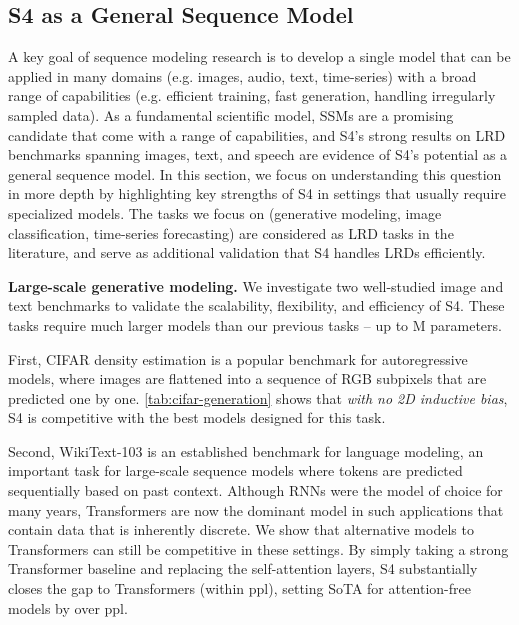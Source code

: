 \documentclass{article}
\newcommand{\methodabbrv}{S4}
\begin{document}
\subsection{\methodabbrv{} as a General Sequence Model}
\label{sec:experiments-general}

A key goal of sequence modeling research is to develop a single model that can be applied in many domains (e.g. images, audio, text, time-series) with a broad range of capabilities (e.g. efficient training, fast generation, handling irregularly sampled data).
As a fundamental scientific model, SSMs are a promising candidate that come with a range of capabilities, and \methodabbrv's strong results on LRD benchmarks spanning images, text, and speech are evidence of \methodabbrv's potential as a general sequence model.
In this section, we focus on understanding this question in more depth by highlighting key strengths of \methodabbrv{} in settings that usually require specialized models.
The tasks we focus on (generative modeling, image classification, time-series forecasting)
are considered as LRD tasks in the literature,
and serve as additional validation that \methodabbrv{} handles LRDs efficiently.


\textbf{Large-scale generative modeling.}
We investigate two well-studied image and text benchmarks to validate the scalability, flexibility, and efficiency of \methodabbrv.
These tasks require much larger models than our previous tasks -- up to M parameters.

First, CIFAR density estimation is a popular benchmark for autoregressive models, where images are flattened into a sequence of  RGB subpixels that are predicted one by one.
\cref{tab:cifar-generation} shows that \emph{with no 2D inductive bias}, \methodabbrv{} is competitive with the best models designed for this task.

Second, WikiText-103 is an established benchmark for language modeling, an important task for large-scale sequence models where tokens are predicted sequentially based on past context.
Although RNNs were the model of choice for many years, Transformers are now the dominant model in such applications that contain data that is inherently discrete.
We show that alternative models to Transformers can still be competitive in these settings.
By simply taking a strong Transformer baseline \citep{baevski2018adaptive} and replacing the self-attention layers,
\methodabbrv{} substantially closes the gap to Transformers (within  ppl), setting SoTA for attention-free models by over  ppl.
\end{document}
